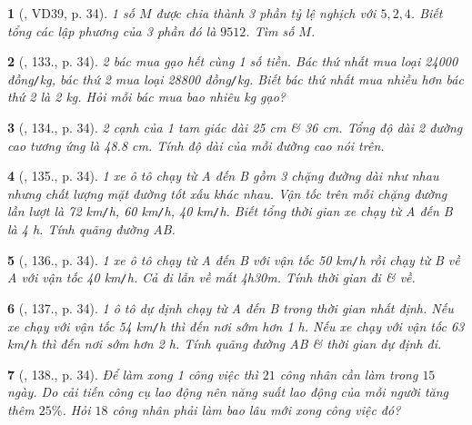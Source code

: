\documentclass{article}
\newtheorem{baitoan}{}
\begin{document}
\begin{baitoan}[\cite{Tuyen_Toan_7}, VD39, p. 34]
	1 số $M$ được chia thành 3 phần tỷ lệ nghịch với $5,2,4$. Biết tổng các lập phương của 3 phần đó là $9512$. Tìm số $M$.
\end{baitoan}

\begin{baitoan}[\cite{Tuyen_Toan_7}, 133., p. 34]
	2 bác mua gạo hết cùng 1 số tiền. Bác thứ nhất mua loại {\rm24000 đồng{\tt/}kg}, bác thứ 2 mua loại {\rm28800 đồng{\tt/}kg}. Biết bác thứ nhất mua nhiều hơn bác thứ 2 là {\rm2 kg}. Hỏi mỗi bác mua bao nhiêu {\rm kg} gạo?
\end{baitoan}

\begin{baitoan}[\cite{Tuyen_Toan_7}, 134., p. 34]
	2 cạnh của 1 tam giác dài {\rm25 cm} \& {\rm36 cm}. Tổng độ dài 2 đường cao tương ứng là {\rm48.8 cm}. Tính độ dài của mỗi đường cao nói trên.
\end{baitoan}

\begin{baitoan}[\cite{Tuyen_Toan_7}, 135., p. 34]
	1 xe ô tô chạy từ A đến B gồm 3 chặng đường dài như nhau nhưng chất lượng mặt đường tốt xấu khác nhau. Vận tốc trên mỗi chặng đường lần lượt là {\rm72 km{\tt/}h}, {\rm60 km{\tt/}h}, {\rm40 km{\tt/}h}. Biết tổng thời gian xe chạy từ A đến B là {\rm4 h}. Tính quãng đường AB.
\end{baitoan}

\begin{baitoan}[\cite{Tuyen_Toan_7}, 136., p. 34]	
	1 xe ô tô chạy từ A đến B với vận tốc {\rm50 km{\tt/}h} rồi chạy từ B về A với vận tốc {\rm40 km{\tt/}h}. Cả đi lẫn về mất {\rm4h30m}. Tính thời gian đi \& về.
\end{baitoan}

\begin{baitoan}[\cite{Tuyen_Toan_7}, 137., p. 34]
	1 ô tô dự định chạy từ A đến B trong thời gian nhất định. Nếu xe chạy với vận tốc {\rm54 km{\tt/}h} thì đến nơi sớm hơn {\rm1 h}. Nếu xe chạy với vận tốc {\rm63 km{\tt/}h} thì đến nơi sớm hơn {\rm2 h}. Tính quãng đường AB \& thời gian dự định đi.
\end{baitoan}

\begin{baitoan}[\cite{Tuyen_Toan_7}, 138., p. 34]
	Để làm xong 1 công việc thì $21$ công nhân cần làm trong $15$ ngày. Do cải tiến công cụ lao động nên năng suất lao động của mỗi người tăng thêm $25\%$. Hỏi $18$ công nhân phải làm bao lâu mới xong công việc đó?
\end{baitoan}
\end{document}
